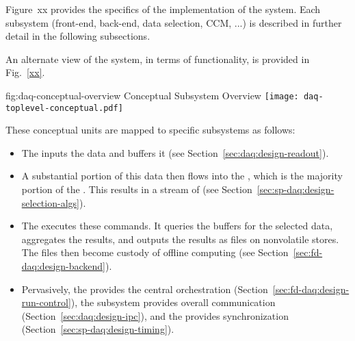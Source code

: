 Figure~{xx} provides the specifics of the implementation of the
system. Each subsystem (front-end, back-end, data selection, CCM, ...)
is described in further detail in the following subsections.

An alternate view of the system, in terms of functionality, is
provided in Fig.~\ref{xx}.

\begin{dunefigure}{fig:daq-conceptual-overview}{ Conceptual
    Subsystem Overview}
  \texttt{[image: daq-toplevel-conceptual.pdf]}
\end{dunefigure}

These conceptual units are mapped to specific  subsystems as follows:


\begin{itemize}
\item The  inputs the data and buffers it (see Section~\ref{sec:daq:design-readout}).

\item A substantial portion of this data then flows into the , which is the majority portion of the . This results in a stream of  (see Section~\ref{sec:sp-daq:design-selection-algs}).

\item The  executes these commands. It  queries the buffers for the selected data, aggregates the results, and outputs the results as files on nonvolatile stores. The files then become custody of offline computing (see Section~\ref{sec:fd-daq:design-backend}).


\item Pervasively, the   provides the central orchestration (Section~\ref{sec:fd-daq:design-run-control}), the  subsystem provides overall communication (Section~\ref{sec:daq:design-ipc}), and the  provides synchronization (Section~\ref{sec:sp-daq:design-timing}).
\end{itemize}


